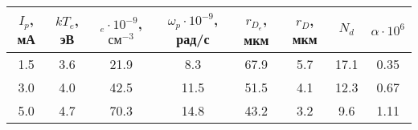 \begin{tabular}{cccccccc}
\toprule
$I_p$, мА & $kT_e$, эВ & $_e\cdot10^{-9}$, $\text{см}^{-3}$ & $\omega_p\cdot10^{-9}$, рад/с & $r_{D_e}$, мкм & $r_D$, мкм & $N_d$ & $\alpha \cdot 10^6$ \\
\midrule
1.5  & 3.6 & 21.9 &  8.3 & 67.9 & 5.7 & 17.1 & 0.35 \\
3.0  & 4.0 & 42.5 & 11.5 & 51.5 & 4.1 & 12.3 & 0.67 \\
5.0  & 4.7 & 70.3 & 14.8 & 43.2 & 3.2 &  9.6 & 1.11 \\
\bottomrule
\end{tabular}